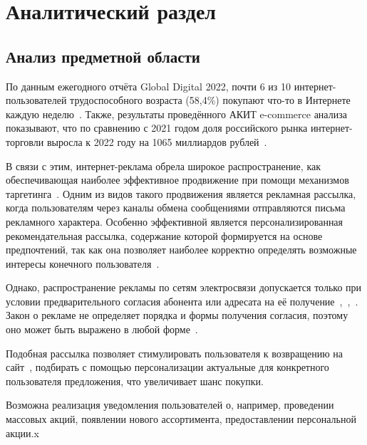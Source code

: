 \chapter{Аналитический раздел}


\section{Анализ предметной области}
\par По данным ежегодного отчёта Global Digital 2022, почти 6 из 10 интернет-пользователей трудоспособного возраста (58,4\%) покупают что-то в Интернете каждую неделю~\cite{bib2}. Также, результаты проведённого АКИТ e-commerce анализа показывают, что по сравнению с 2021 годом доля российского рынка интернет-торговли выросла к 2022 году на 1065 миллиардов рублей~\cite{bib3}.

\par В связи с этим, интернет-реклама обрела широкое распространение, как обеспечивающая наиболее эффективное продвижение при помощи механизмов таргетинга~\cite{bib4}. Одним из видов такого продвижения является рекламная рассылка, когда пользователям через каналы обмена сообщениями отправляются письма рекламного характера. Особенно эффективной является персонализированная рекомендательная рассылка, содержание которой формируется на основе предпочтений, так как она позволяет наиболее корректно определять возможные интересы конечного пользователя~\cite{bib5}.

\par Однако, распространение рекламы по сетям электросвязи допускается только при условии предварительного согласия абонента или адресата на её получение~\cite{bib6},~\cite{bib7},~\cite{bib8}. Закон о рекламе не определяет порядка и формы получения согласия, поэтому оно может быть выражено в любой форме~\cite{bib9}. 

\par Подобная рассылка позволяет стимулировать пользователя к возвращению на сайт~\cite{bib4}, подбирать с помощью персонализации актуальные для конкретного пользователя предложения, что увеличивает шанс покупки.

\par Возможна реализация уведомления пользователей о, например, проведении массовых акций, появлении нового ассортимента, предоставлении персональной акции.x

